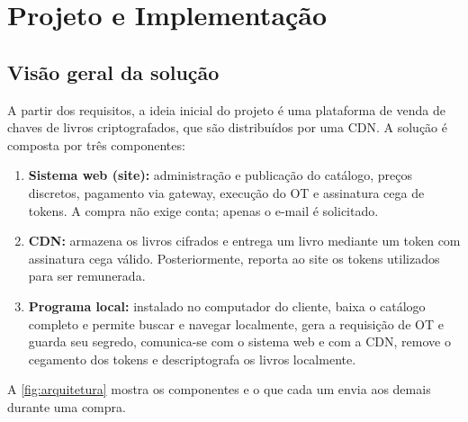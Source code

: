 \section{Projeto e Implementação}\label{sec:projeto}

\subsection{Visão geral da solução}

A partir dos requisitos, a ideia inicial do projeto é uma plataforma de venda
de chaves de livros criptografados, que são distribuídos por uma CDN. A
solução é composta por três componentes:

\begin{enumerate}
\item \textbf{Sistema web (site):} administração e publicação do catálogo,
preços discretos, pagamento via gateway, execução do OT e assinatura cega de
tokens. A compra não exige conta; apenas o e-mail é solicitado.

\item \textbf{CDN:} armazena os livros cifrados e entrega um livro mediante um
token com assinatura cega válido. Posteriormente, reporta ao site os tokens
utilizados para ser remunerada.

\item \textbf{Programa local:} instalado no computador do cliente, baixa o
catálogo completo e permite buscar e navegar localmente, gera a requisição de
OT e guarda seu segredo, comunica-se com o sistema web e com a CDN, remove o
cegamento dos tokens e descriptografa os livros localmente.
\end{enumerate}

A \autoref{fig:arquitetura} mostra os componentes e o que cada um envia aos
demais durante uma compra.


